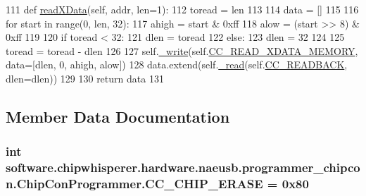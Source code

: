 \begin{DoxyCode}
111     \textcolor{keyword}{def }\hyperlink{classsoftware_1_1chipwhisperer_1_1hardware_1_1naeusb_1_1programmer__chipcon_1_1ChipConProgrammer_a9e8d0ed6ff9d1b4d16fdef494653fae1}{readXData}(self, addr, len=1):
112         toread = len
113 
114         data = []
115 
116         \textcolor{keywordflow}{for} start \textcolor{keywordflow}{in} range(0, len, 32):
117             ahigh = start & 0xff
118             alow = (start >> 8) & 0xff
119 
120             \textcolor{keywordflow}{if} toread < 32:
121                 dlen = toread
122             \textcolor{keywordflow}{else}:
123                 dlen = 32
124 
125             toread = toread - dlen
126 
127             self.\hyperlink{classsoftware_1_1chipwhisperer_1_1hardware_1_1naeusb_1_1programmer__chipcon_1_1ChipConProgrammer_aae3032d35dd16176bd31f1772323aad3}{\_write}(self.\hyperlink{classsoftware_1_1chipwhisperer_1_1hardware_1_1naeusb_1_1programmer__chipcon_1_1ChipConProgrammer_a9d38492f05c71df0c45881013dae95e5}{CC\_READ\_XDATA\_MEMORY}, data=[dlen, 0, ahigh, alow])
128             data.extend(self.\hyperlink{classsoftware_1_1chipwhisperer_1_1hardware_1_1naeusb_1_1programmer__chipcon_1_1ChipConProgrammer_ac8426ec7aac85f2e64e90e13a66d74fd}{\_read}(self.\hyperlink{classsoftware_1_1chipwhisperer_1_1hardware_1_1naeusb_1_1programmer__chipcon_1_1ChipConProgrammer_a1a0c5b72371db608bb95081f958f247a}{CC\_READBACK}, dlen=dlen))
129 
130         \textcolor{keywordflow}{return} data
131 
\end{DoxyCode}


\subsection{Member Data Documentation}
\hypertarget{classsoftware_1_1chipwhisperer_1_1hardware_1_1naeusb_1_1programmer__chipcon_1_1ChipConProgrammer_af9f9250d4cdda0749863e5d81e9d1d0a}{}
\subsubsection[{C\+C\+\_\+\+C\+H\+I\+P\+\_\+\+E\+R\+A\+S\+E}]{\setlength{\rightskip}{0pt plus 5cm}int software.\+chipwhisperer.\+hardware.\+naeusb.\+programmer\+\_\+chipcon.\+Chip\+Con\+Programmer.\+C\+C\+\_\+\+C\+H\+I\+P\+\_\+\+E\+R\+A\+S\+E = 0x80\hspace{0.3cm}{\ttfamily [static]}}\label{classsoftware_1_1chipwhisperer_1_1hardware_1_1naeusb_1_1programmer__chipcon_1_1ChipConProgrammer_af9f9250d4cdda0749863e5d81e9d1d0a}


